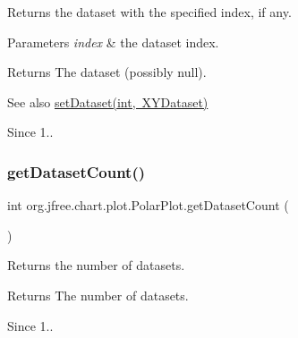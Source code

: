 Returns the dataset with the specified index, if any.


\begin{DoxyParams}{Parameters}
{\em index} & the dataset index.\\
\hline
\end{DoxyParams}
\begin{DoxyReturn}{Returns}
The dataset (possibly {\ttfamily null}).
\end{DoxyReturn}
\begin{DoxySeeAlso}{See also}
\mbox{\hyperlink{classorg_1_1jfree_1_1chart_1_1plot_1_1_polar_plot_a281f527dd6ecc96f700fd97304c1b9d5}{set\+Dataset(int, X\+Y\+Dataset)}}
\end{DoxySeeAlso}
\begin{DoxySince}{Since}
1.. 
\end{DoxySince}
\mbox{\label{classorg_1_1jfree_1_1chart_1_1plot_1_1_polar_plot_a02749336dcc9281dc6bd2af61145f5af}} 
\subsubsection{\texorpdfstring{get\+Dataset\+Count()}{getDatasetCount()}}
{\footnotesize\ttfamily int org.\+jfree.\+chart.\+plot.\+Polar\+Plot.\+get\+Dataset\+Count (\begin{DoxyParamCaption}{ }\end{DoxyParamCaption})}

Returns the number of datasets.

\begin{DoxyReturn}{Returns}
The number of datasets.
\end{DoxyReturn}
\begin{DoxySince}{Since}
1.. 
\end{DoxySince}
\mbox{\label{classorg_1_1jfree_1_1chart_1_1plot_1_1_polar_plot_af0152e32f5a043b5313c82db825d0154}} 
